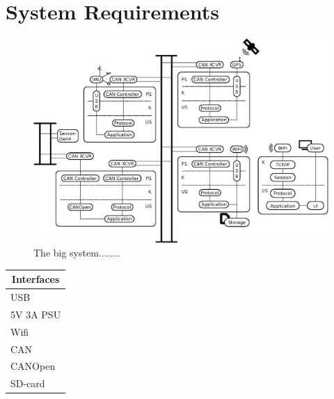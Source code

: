 \section{System Requirements} %
\label{sec:system_requirements}


\begin{figure}[!h]
\centering
\includegraphics[angle=90,width=\textwidth]{graphics/analysis_complex.eps}
\caption{The big system........}
\label{fig:complete_system}
\end{figure}









\begin{tabular}{ |p{3cm}| }
\hline
\multicolumn{1}{|c|}{\textbf{Interfaces}}\\
\hline
USB \\
5V 3A PSU \\
Wifi \\
CAN \\
CANOpen \\
SD-card \\
\hline
\end{tabular}



